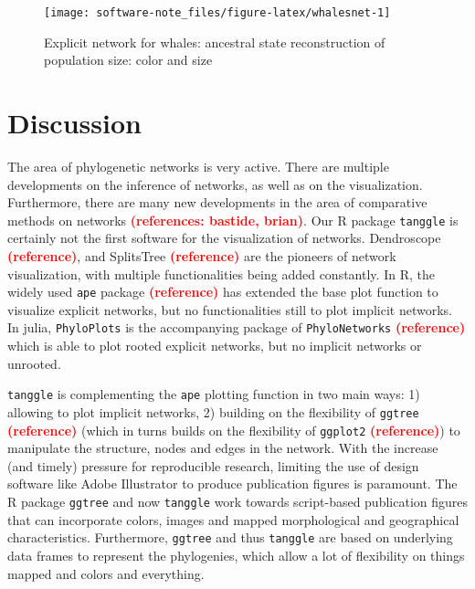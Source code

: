 \documentclass[]{article}
\begin{document}
\begin{figure}[H]

{\centering \texttt{[image: software-note\_files/figure-latex/whalesnet-1]} 

}

\caption{Explicit network for whales: ancestral state reconstruction of population size: color and size}\label{fig:whalesnet}
\end{figure}

\hypertarget{discussion}{%
\section{Discussion}\label{discussion}}

The area of phylogenetic networks is very active. There are multiple
developments on the inference of networks, as well as on the
visualization. Furthermore, there are many new developments in the area
of comparative methods on networks
\textcolor{red}{\textbf{(references: bastide, brian)}}. Our R package
\texttt{tanggle} is certainly not the first software for the
visualization of networks. Dendroscope
\textcolor{red}{\textbf{(reference)}}, and SplitsTree
\textcolor{red}{\textbf{(reference)}} are the pioneers of network
visualization, with multiple functionalities being added constantly. In
R, the widely used \texttt{ape} package
\textcolor{red}{\textbf{(reference)}} has extended the base plot
function to visualize explicit networks, but no functionalities still to
plot implicit networks. In julia, \texttt{PhyloPlots} is the
accompanying package of \texttt{PhyloNetworks}
\textcolor{red}{\textbf{(reference)}} which is able to plot rooted
explicit networks, but no implicit networks or unrooted.

\texttt{tanggle} is complementing the \texttt{ape} plotting function in
two main ways: 1) allowing to plot implicit networks, 2) building on the
flexibility of \texttt{ggtree} \textcolor{red}{\textbf{(reference)}}
(which in turns builds on the flexibility of \texttt{ggplot2}
\textcolor{red}{\textbf{(reference)}}) to manipulate the structure,
nodes and edges in the network. With the increase (and timely) pressure
for reproducible research, limiting the use of design software like
Adobe Illustrator to produce publication figures is paramount. The R
package \texttt{ggtree} and now \texttt{tanggle} work towards
script-based publication figures that can incorporate colors, images and
mapped morphological and geographical characteristics. Furthermore,
\texttt{ggtree} and thus \texttt{tanggle} are based on underlying data
frames to represent the phylogenies, which allow a lot of flexibility on
things mapped and colors and everything.

\pagebreak

\end{document}
